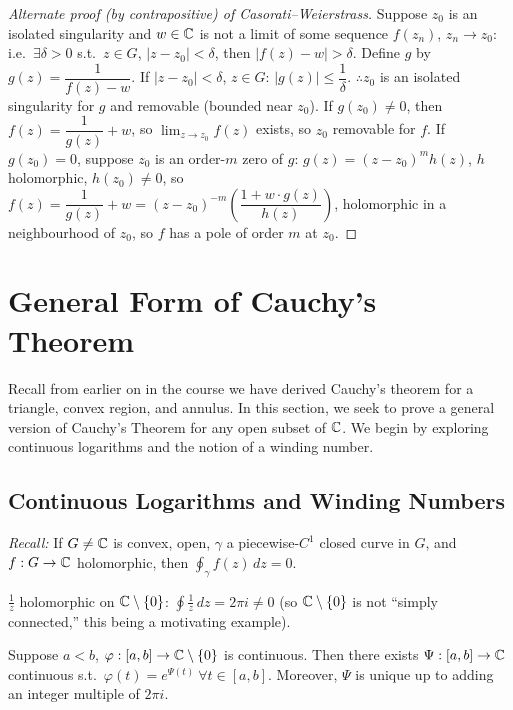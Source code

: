 \documentclass[11pt]{article}
\begin{document}
\begin{proof}[Alternate proof (by contrapositive) of Casorati--Weierstrass]
Suppose $z_0$ is an isolated singularity and $w\in{\mathbb{C}}$ is not a limit of some sequence $f(z_n)$, $z_n\to z_0$: i.e.\ $\exists \delta>0$ s.t.\ $z\in G$, $|z-z_0|<\delta$, then $|f(z)-w|>\delta$.
Define $g$ by $g(z) = \dfrac{1}{f(z)-w}$. If $|z-z_0|<\delta$, $z\in G$: $|g(z)| \le \dfrac1\delta$.
$\therefore z_0$ is an isolated singularity for $g$ and removable (bounded near $z_0$).
If $g(z_0)\ne0$, then $f(z) = \dfrac{1}{g(z)}+w$, so $\lim_{z\to z_0} f(z)$ exists, so $z_0$ removable for $f$.
If $g(z_0)=0$, suppose $z_0$ is an order-$m$ zero of $g$: $g(z)=(z-z_0)^mh(z)$, $h$ holomorphic, $h(z_0)\ne0$, so $f(z)=\dfrac{1}{g(z)}+w=(z-z_0)^{-m}\left(\dfrac{1+w\cdot g(z)}{h(z)}\right)$, holomorphic in a neighbourhood of $z_0$, so $f$ has a pole of order $m$ at $z_0$.
\end{proof}

\newpage
\section{General Form of Cauchy's Theorem}

Recall from earlier on in the course we have derived Cauchy's theorem for a triangle, convex region, and annulus. In this section, we seek to prove a general version of Cauchy's Theorem for any open subset of ${\mathbb{C}}$. We begin by exploring continuous logarithms and the notion of a winding number.

\subsection{Continuous Logarithms and Winding Numbers}
\emph{Recall:} If $G\ne{\mathbb{C}}$ is convex, open, $\gamma$ a piecewise-$C^1$ closed curve in $G$, and $f:G\to{\mathbb{C}}$ holomorphic, then $\oint_\gamma f(z)\,dz=0$.

\begin{example}
$\frac1z$ holomorphic on ${\mathbb{C}}\setminus\{0\}$: $\oint \frac1z\,dz = 2\pi i \ne 0$ (so ${\mathbb{C}}\setminus\{0\}$ is not ``simply connected,'' this being a motivating example).
\end{example}

\begin{theorem}
Suppose $a<b$, $\varphi:[a,b]\to{\mathbb{C}}\setminus\{0\}$ is continuous. Then there exists $\Psi:[a,b]\to{\mathbb{C}}$ continuous s.t.\ $\varphi(t) = e^{\Psi(t)}\ \forall t\in[a,b]$. Moreover, $\Psi$ is unique up to adding an integer multiple of $2\pi i$.
\end{theorem}
\end{document}
